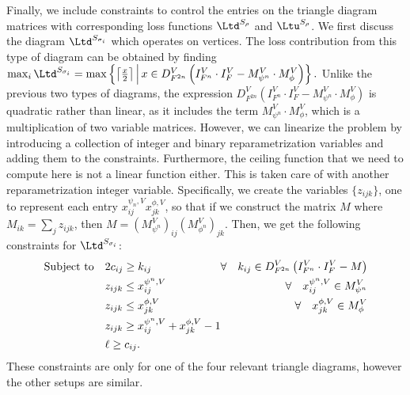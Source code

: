     

Finally, we include constraints to control the entries on the triangle diagram matrices with corresponding loss functions  $\Ltd^{S_\rho}$ and $\Ltu^{S_\rho}$.   
We first  discuss the diagram $\Ltd^{S_{\sigma_i}}$ which operates on vertices. 
The loss contribution from this type of diagram can be obtained by finding 
    $
    \max_{i} \Ltd^{S_{\sigma_{i}}} = \max \left\{ \left\lceil\tfrac{x}{2}\right\rceil  \, \middle|\,  x \in D_{F^{2n}}^V \left(I_{F^n}^V \cdot I_F^V - M_{\psi^n}^V\cdot M_{\phi}^V \right) \right\}.
    $
Unlike the previous two types of diagrams, the expression $D_{F^{2n}}^V \left(I_{F^n}^V \cdot I_F^V - M_{\psi^n}^V\cdot M_{\phi}^V \right)$ is quadratic rather than linear, as it includes the term $M_{\psi^n}^V\cdot M_{\phi}^V$, which is a multiplication of two variable matrices. 
However, we can linearize the problem by introducing a collection of integer and binary reparametrization variables and adding them to the constraints.
    Furthermore, the ceiling function that we need to compute here is not a linear function either.
    This is taken care of with another reparametrization integer variable.
Specifically, we create the variables $\{z_{ijk}  \}$, one to represent each entry $x_{ij}^{\psi_n,V} x_{jk}^{\phi,V}$, so that if we construct the matrix $M$ where $M_{ik} = \sum_j z_{ijk} $, then 
${M = (M_{\psi^n}^V)_{ij}(M_{\phi^n}^V)_{jk}}$. 
Then, we get the following constraints for $\Ltd^{S_{\sigma_{i}}}$:
    \begin{align*}
        \text{Subject to} 
        \begin{alignedat}[t]{3}
        \quad & 2c_{ij} \geq k_{ij} \quad  
            &\forall \quad k_{ij} \in D_{F^{2n}}^V \left(I_{F^n}^V \cdot I_F^V - M \right)\\
        \quad & z_{ijk} \leq x_{ij}^{\psi^n,V} 
            &\forall \quad x_{ij}^{\psi^n,V} \in M_{\psi^n}^V\\
        \quad & z_{ijk} \leq x_{jk}^{\phi,V} \quad 
            &\forall \quad x_{jk}^{\phi,V} \in M_{\phi}^V\\
        \quad & z_{ijk} \geq x_{ij}^{\psi^n,V} + x_{jk}^{\phi,V} - 1\\
        \quad & \ell \geq c_{ij}.
        \end{alignedat}
    \end{align*}
    These constraints are only for one of the four relevant triangle diagrams, however the other setups are similar. 
    

